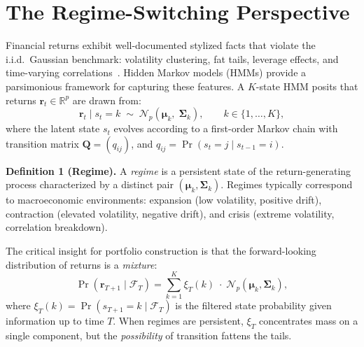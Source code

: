 \section{The Regime-Switching Perspective}

Financial returns exhibit well-documented stylized facts that violate the i.i.d.\ Gaussian benchmark: volatility clustering, fat tails, leverage effects, and time-varying correlations~\cite{cont2001}. Hidden Markov models (HMMs) provide a parsimonious framework for capturing these features. A $K$-state HMM posits that returns $\mathbf{r}_t \in \mathbb{R}^p$ are drawn from:
\begin{equation}
\mathbf{r}_t \mid s_t = k \;\sim\; \mathcal{N}_p\!\left(\boldsymbol{\mu}_k,\; \boldsymbol{\Sigma}_k\right), \qquad k \in \{1,\dots,K\},
\label{eq:hmm}
\end{equation}
where the latent state $s_t$ evolves according to a first-order Markov chain with transition matrix $\mathbf{Q} = (q_{ij})$, and $q_{ij} = \Pr(s_t = j \mid s_{t-1} = i)$.

\begin{definitionbox}
\textbf{Definition 1 (Regime).} A \textit{regime} is a persistent state of the return-generating process characterized by a distinct pair $(\boldsymbol{\mu}_k, \boldsymbol{\Sigma}_k)$. Regimes typically correspond to macroeconomic environments: expansion (low volatility, positive drift), contraction (elevated volatility, negative drift), and crisis (extreme volatility, correlation breakdown).
\end{definitionbox}

The critical insight for portfolio construction is that the forward-looking distribution of returns is a \textit{mixture}:
\begin{equation}
\Pr(\mathbf{r}_{T+1} \mid \mathcal{F}_T) = \sum_{k=1}^{K} \xi_{T}(k) \;\cdot\; \mathcal{N}_p(\boldsymbol{\mu}_k, \boldsymbol{\Sigma}_k),
\label{eq:mixture}
\end{equation}
where $\xi_T(k) = \Pr(s_{T+1}=k \mid \mathcal{F}_T)$ is the filtered state probability given information up to time $T$. When regimes are persistent, $\xi_T$ concentrates mass on a single component, but the \textit{possibility} of transition fattens the tails.
